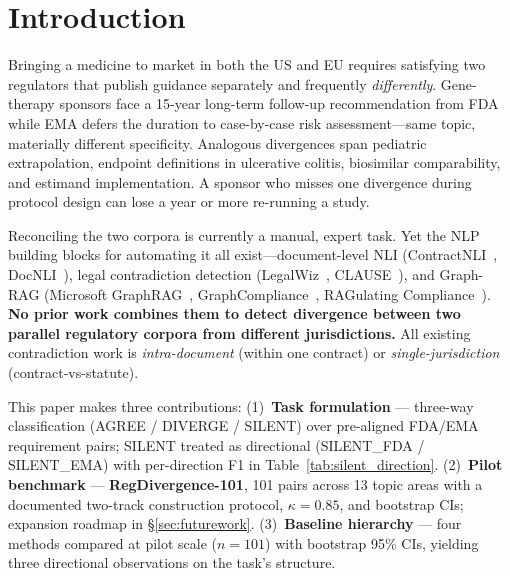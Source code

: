 \documentclass[manuscript]{acmart}
\begin{document}


\maketitle

\section{Introduction}

Bringing a medicine to market in both the US and EU requires satisfying two
regulators that publish guidance separately and frequently \textit{differently}.
Gene-therapy sponsors face a 15-year long-term follow-up recommendation from FDA
while EMA defers the duration to case-by-case risk assessment---same topic,
materially different specificity. Analogous divergences span pediatric
extrapolation, endpoint definitions in ulcerative colitis, biosimilar
comparability, and estimand implementation. A sponsor who misses one divergence
during protocol design can lose a year or more re-running a study.

Reconciling the two corpora is currently a manual, expert task. Yet the NLP
building blocks for automating it all exist---document-level NLI
(ContractNLI~\cite{koreeda2021contractnli}, DocNLI~\cite{yin2021docnli}),
legal contradiction detection (LegalWiz~\cite{legalwiz2025},
CLAUSE~\cite{betterclause2026}), and Graph-RAG (Microsoft
GraphRAG~\cite{edge2024graphrag}, GraphCompliance~\cite{graphcompliance2025},
RAGulating Compliance~\cite{ragulating2025}). \textbf{No prior work combines
them to detect divergence between two parallel regulatory corpora from different
jurisdictions.} All existing contradiction work is \textit{intra-document}
(within one contract) or \textit{single-jurisdiction} (contract-vs-statute).

\begin{revblock}
This paper makes three contributions: (1)~\textbf{Task formulation} ---
three-way classification (AGREE / DIVERGE / SILENT) over pre-aligned FDA/EMA
requirement pairs; SILENT treated as directional (SILENT\_FDA / SILENT\_EMA)
with per-direction F1 in Table~\ref{tab:silent_direction}. (2)~\textbf{Pilot
benchmark} --- \textbf{RegDivergence-101}, 101 pairs across 13 topic areas with
a documented two-track construction protocol, $\kappa = 0.85$, and bootstrap
CIs; expansion roadmap in \S\ref{sec:futurework}. (3)~\textbf{Baseline
hierarchy} --- four methods compared at pilot scale ($n = 101$) with bootstrap
95\% CIs, yielding three directional observations on the task's structure.
\end{revblock}
\end{document}
